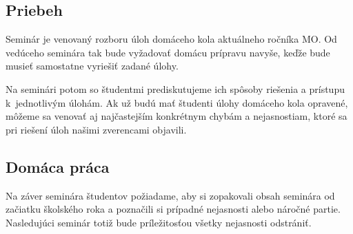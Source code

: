 
\subsection*{Priebeh}
Seminár je venovaný rozboru úloh domáceho kola aktuálneho ročníka MO. Od vedúceho seminára tak bude vyžadovať domácu prípravu navyše, keďže bude musieť samostatne vyriešiť zadané úlohy.

Na seminári potom so študentmi prediskutujeme ich spôsoby riešenia a prístupu k~jednotlivým úlohám. Ak už budú mať študenti úlohy domáceho kola opravené, môžeme sa venovať aj najčastejším konkrétnym chybám a nejasnostiam, ktoré sa pri riešení úloh našimi zverencami objavili.

\subsection*{Domáca práca}
Na záver seminára študentov požiadame, aby si zopakovali obsah seminára od začiatku školského roka a poznačili si prípadné nejasnosti alebo náročné partie. Nasledujúci seminár totiž bude príležitosťou všetky nejasnosti odstrániť.


